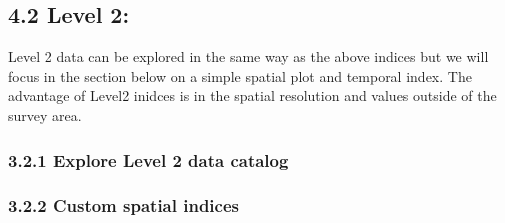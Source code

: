 \documentclass[
]{article}
\begin{document}
\hypertarget{level-2}{%
\subsection{4.2 Level 2:}\label{level-2}}

Level 2 data can be explored in the same way as the above indices but we
will focus in the section below on a simple spatial plot and temporal
index. The advantage of Level2 inidces is in the spatial resolution and
values outside of the survey area.

\hypertarget{explore-level-2-data-catalog}{%
\subsubsection{3.2.1 Explore Level 2 data
catalog}\label{explore-level-2-data-catalog}}

\hypertarget{custom-spatial-indices}{%
\subsubsection{3.2.2 Custom spatial
indices}\label{custom-spatial-indices}}
\end{document}
